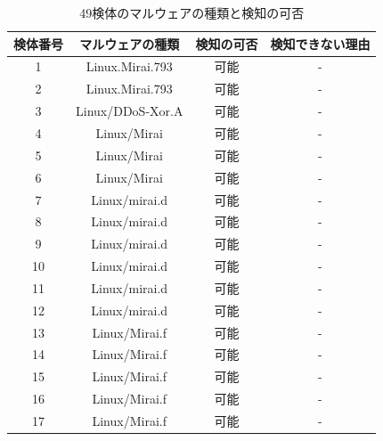 \begin{small}
\begin{flushleft}
\begin{longtable}{|c|c|c|c|}
    \caption{49検体のマルウェアの種類と検知の可否}
    \label{tab:malware} \\
    \hline
    検体番号   & マルウェアの種類             & 検知の可否 & 検知できない理由                      \\ \hline
    \endhead
        1  & Linux.Mirai.793      & 可能    & -                             \\ \hline
        2  & Linux.Mirai.793      & 可能    & -                             \\ \hline
        3  & Linux/DDoS-Xor.A     & 可能    & -                             \\ \hline
        4  & Linux/Mirai          & 可能    & -                             \\ \hline
        5  & Linux/Mirai          & 可能    & -                             \\ \hline
        6  & Linux/Mirai          & 可能    & -                             \\ \hline
        7  & Linux/mirai.d        & 可能    & -                             \\ \hline
        8  & Linux/mirai.d        & 可能    & -                             \\ \hline
        9  & Linux/mirai.d        & 可能    & -                             \\ \hline
        10 & Linux/mirai.d        & 可能    & -                             \\ \hline
        11 & Linux/mirai.d        & 可能    & -                             \\ \hline
        12 & Linux/mirai.d        & 可能    & -                             \\ \hline
        13 & Linux/Mirai.f        & 可能    & -                             \\ \hline
        14 & Linux/Mirai.f        & 可能    & -                             \\ \hline
        15 & Linux/Mirai.f        & 可能    & -                             \\ \hline
        16 & Linux/Mirai.f        & 可能    & -                             \\ \hline
        17 & Linux/Mirai.f        & 可能    & -                             \\ \hline

\end{longtable}
\end{flushleft}
\end{small}

